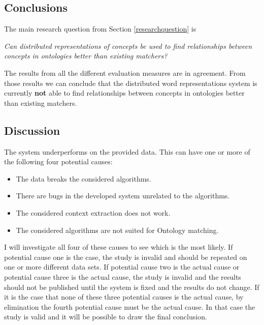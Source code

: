 \documentclass{article}
\begin{document}
 \subsection{Conclusions} \label{conclusions}
 The main research question from Section \ref{researchquestion} is
 \begin{center}
 \textit{
 Can distributed representations of concepts be used to find relationships between concepts in ontologies better than existing matchers?
 }
 \end{center}
 
 The results from all the different evaluation measures are in agreement. From those results we can conclude that the distributed word representations system is currently \textbf{not} able to find relationships between concepts in ontologies better than existing matchers.

 \subsection{Discussion}
  The system underperforms on the provided data. This can have one or more of the following four potential causes:
  \begin{itemize}
  \item The data breaks the considered algorithms.
  \item There are bugs in the developed system unrelated to the algorithms.
  \item The considered context extraction does not work.
  \item The considered algorithms are not suited for Ontology matching.
  \end{itemize}
  
  I will investigate all four of these causes to see which is the most likely. If potential cause one is the case, the study is invalid and should be repeated on one or more different data sets. If potential cause two is the actual cause or potential cause three is the actual cause, the study is invalid and the results should not be published until the system is fixed and the results do not change. If it is the case that none of these three potential causes is the actual cause, by elimination the fourth potential cause must be the actual cause. In that case the study is valid and it will be possible to draw the final conclusion.
  
\end{document}
